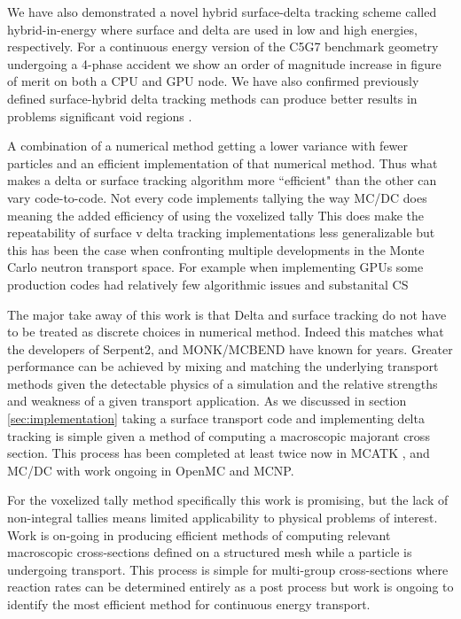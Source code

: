 We have also demonstrated a novel hybrid surface-delta tracking scheme called hybrid-in-energy where surface and delta are used in low and high energies, respectively.
For a continuous energy version of the C5G7 benchmark geometry undergoing a 4-phase accident we show an order of magnitude increase in figure of merit on both a CPU and GPU node.
We have also confirmed previously defined surface-hybrid delta tracking methods can produce better results in problems significant void regions \cite{leppanen_2010_burnup}.

A combination of a numerical method getting a lower variance with fewer particles and an efficient implementation of that numerical method.
Thus what makes a delta or surface tracking algorithm more ``efficient" than the other can vary code-to-code.
Not every code implements tallying the way MC/DC does meaning the added efficiency of using the voxelized tally 
This does make the repeatability of surface v delta tracking implementations less generalizable but this has been the case when confronting multiple developments in the Monte Carlo neutron transport space.
For example when implementing GPUs some production codes had relatively few algorithmic issues and substanital CS

The major take away of this work is that Delta and surface tracking do not have to be treated as discrete choices in numerical method.
Indeed this matches what the developers of Serpent2, and MONK/MCBEND have known for years.
Greater performance can be achieved by mixing and matching the underlying transport methods given the detectable physics of a simulation and the relative strengths and weakness of a given transport application.
As we discussed in section \ref{sec:implementation} taking a surface transport code and implementing delta tracking is simple given a method of computing a macroscopic majorant cross section.
This process has been completed at least twice now in MCATK \cite{morgan2023delta}, and MC/DC with work ongoing in OpenMC and MCNP. %

For the voxelized tally method specifically this work is promising, but the lack of non-integral tallies means limited applicability to physical problems of interest.
Work is on-going in producing efficient methods of computing relevant macroscopic cross-sections defined on a structured mesh while a particle is undergoing transport.
This process is simple for multi-group cross-sections where reaction rates can be determined entirely as a post process but work is ongoing to identify the most efficient method for continuous energy transport.

